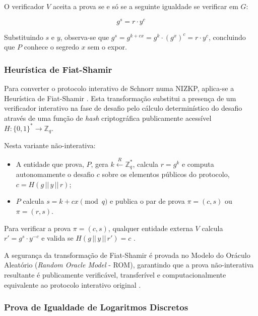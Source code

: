 O verificador $V$ aceita a prova se e só se a seguinte igualdade se verificar em $G$:

\begin{equation*}
    g^s = r \cdot y^c
\end{equation*}

Substituindo $s$ e $y$, observa-se que $g^s = g^{k+cx} = g^k \cdot (g^x)^c = r \cdot y^c$, concluindo que $P$ conhece o segredo $x$ sem o expor.

\subsubsection{Heurística de Fiat-Shamir}

Para converter o protocolo interativo de Schnorr numa NIZKP, aplica-se a Heurística de Fiat-Shamir \cite{fiatshamir1986how}. Esta transformação substitui a presença de um verificador interativo na fase de desafio pelo cálculo determinístico do desafio através de uma função de \textit{hash} criptográfica publicamente acessível $H : \{0,1\}^* \rightarrow \mathbb{Z}_q$.

Nesta variante não-interativa:

\begin{itemize}
    \item A entidade que prova, $P$, gera $k \xleftarrow{R} \mathbb{Z}_q^*$, calcula $r = g^k$ e computa autonomamente o desafio $c$ sobre os elementos públicos do protocolo, $c = H(g \, || \, y \, || \, r)$;
    \item $P$ calcula $s = k + cx \pmod{q}$ e publica o par de prova $\pi = (c, s)$ ou $\pi = (r, s)$.
\end{itemize}

Para verificar a prova $\pi = (c, s)$, qualquer entidade externa $V$ calcula $r' = g^s \cdot y^{-c}$ e valida se $H(g \, || \, y \, || \, r') = c$ \cite{fiatshamir1986how}.

A segurança da transformação de Fiat-Shamir é provada no Modelo do Oráculo Aleatório (\textit{Random Oracle Model} - ROM), garantindo que a prova não-interativa resultante é publicamente verificável, transferível e computacionalmente equivalente ao protocolo interativo original \cite{fiatshamir1986how}.

\subsubsection{Prova de Igualdade de Logaritmos Discretos}
\label{ssec:dleq_prova}


